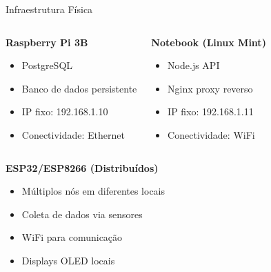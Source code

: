 \documentclass[12pt,aspectratio=16:9]{beamer}
\begin{document}
\begin{frame}{Infraestrutura Física}
    \begin{columns}
        \begin{block}{\textbf{Raspberry Pi 3B}}
            \begin{itemize}
                \item PostgreSQL
                \item Banco de dados persistente
                \item IP fixo: 192.168.1.10
                \item Conectividade: Ethernet
            \end{itemize}
        \end{block}
        
        \begin{block}{\textbf{Notebook (Linux Mint)}}
            \begin{itemize}
                \item Node.js API
                \item Nginx proxy reverso
                \item IP fixo: 192.168.1.11
                \item Conectividade: WiFi
            \end{itemize}
        \end{block}
    \end{columns}
    
    \vspace{0.5cm}
    
    \begin{block}{\textbf{ESP32/ESP8266 (Distribuídos)}}
        \begin{itemize}
            \item Múltiplos nós em diferentes locais
            \item Coleta de dados via sensores
            \item WiFi para comunicação
            \item Displays OLED locais
        \end{itemize}
    \end{block}
\end{frame}
\end{document}
